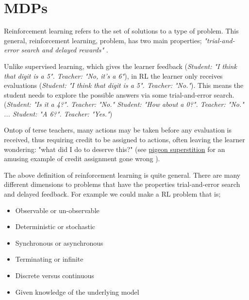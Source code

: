 \chapter{MDPs}

Reinforcement learning refers to the set of solutions to a type of problem.
This general, reinforcement learning, problem, has two main properties;
\textit{"trial-and-error search and delayed rewards"} \cite{Sutton2018}.

Unlike supervised learning, which gives the learner feedback (\textit{Student: "I think that digit
is a 5". Teacher: "No, it's a 6"}), in RL the learner only receives evaluations (\textit{Student: "I think
that digit is a 5". Teacher: "No."}). This means the student needs to explore the possible answers via some trial-and-error search.
(\textit{Student: "Is it a 4?". Teacher: "No." Student: "How about a 0?". Teacher: "No." ... Student: "A 6?". Teacher: "Yes."})

Ontop of terse teachers, many actions may be taken
before any evaluation is received, thus requiring credit to be assigned to actions,
often leaving the learner wondering: "what did I do to deserve this?" (see
\href{https://www.youtube.com/watch?v=Qv4H81gEGDQ}{pigeon superstition} for an amusing
example of credit assignment gone wrong \cite{Box1997}).


\vspace{5mm}

The above definition of reinforcement learning is quite general. There are many
different dimensions to problems that have the properties trial-and-error search and
delayed feedback. For example we could make a RL problem that is;

\begin{itemize}
\tightlist
\item
  Observable or un-observable
\item
  Deterministic or stochastic
\item
  Synchronous or asynchronous
\item
  Terminating or infinite
\item
  Discrete versus continuous
\item
  Given knowledge of the underlying model
\end{itemize}

